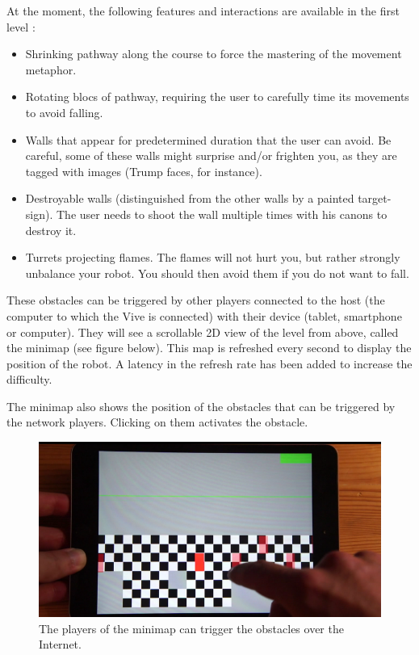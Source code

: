 \documentclass[12pt]{article}
\begin{document}
At the moment, the following features and interactions are available in the first level :

\begin{itemize}
	\item Shrinking pathway along the course to force the mastering of the movement metaphor.
	\item Rotating blocs of pathway, requiring the user to carefully time its movements to avoid falling.
	\item Walls that appear for predetermined duration that the user can avoid. Be careful, some of these walls might surprise and/or frighten you, as they are tagged with images (Trump faces, for instance).
	\item Destroyable walls (distinguished from the other walls by a painted target-sign). The user needs to shoot the wall multiple times with his canons to destroy it.
	\item Turrets projecting flames. The flames will not hurt you, but rather strongly unbalance your robot. You should then avoid them if you do not want to fall.
\end{itemize}

These obstacles can be triggered by other players connected to the host (the computer to which the Vive is connected) with their device (tablet, smartphone or computer). They will see a scrollable 2D view of the level from above, called the minimap (see figure below). This map is refreshed every second to display the position of the robot. A latency in the refresh rate has been added to increase the difficulty.

The minimap also shows the position of the obstacles that can be triggered by the network players. Clicking on them activates the obstacle.

\begin{figure}[h]
   \caption{\label{étiquette} The players of the minimap can trigger the obstacles over the Internet.}
   \includegraphics[scale=0.8]{images/minimap.png}
\end{figure}
\end{document}
